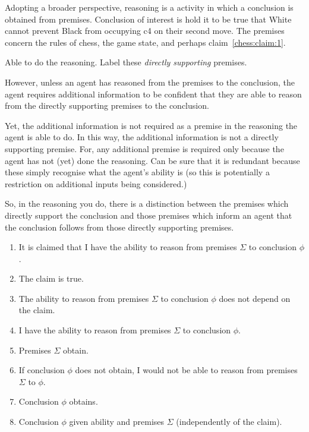 \documentclass[10pt]{article}
\begin{document}
Adopting a broader perspective, reasoning is a activity in which a conclusion is obtained from premises.
Conclusion of interest is hold it to be true that White cannot prevent Black from occupying c4 on their second move.
The premises concern the rules of chess, the game state, and perhaps claim~\ref{chess:claim:1}.

Able to do the reasoning.
Label these \emph{directly supporting} premises.

However, unless an agent has reasoned from the premises to the conclusion, the agent requires additional information to be confident that they are able to reason from the directly supporting premises to the conclusion.

Yet, the additional information is not required as a premise in the reasoning the agent is able to do.
In this way, the additional information is not a directly supporting premise.
For, any additional premise is required only because the agent has not (yet) done the reasoning.
Can be sure that it is redundant because these simply recognise what the agent's ability is (so this is potentially a restriction on additional inputs being considered.)

So, in the reasoning you do, there is a distinction between the premises which directly support the conclusion and those premises which inform an agent that the conclusion follows from those directly supporting premises.


\begin{enumerate}
\item It is claimed that I have the ability to reason from premises \(\Sigma\) to conclusion \(\phi\).
\item The claim is true.
\item The ability to reason from premises \(\Sigma\) to conclusion \(\phi\) does not depend on the claim.
\item I have the ability to reason from premises \(\Sigma\) to conclusion \(\phi\).
\item Premises \(\Sigma\) obtain.
\item If conclusion \(\phi\) does not obtain, I would not be able to reason from premises \(\Sigma\) to \(\phi\).
\item Conclusion \(\phi\) obtains.
\item Conclusion \(\phi\) given ability and premises \(\Sigma\) (independently of the claim).
\end{enumerate}
\end{document}
